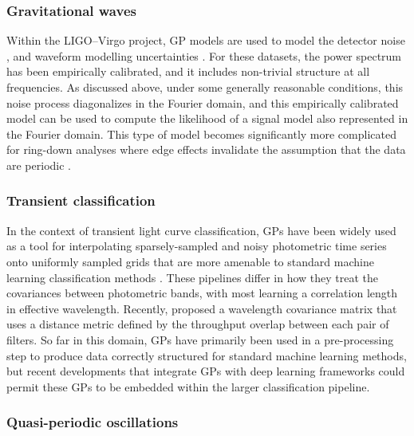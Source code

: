\documentclass[letterpaper]{ar-1col}
\begin{document}
\subsubsection{Gravitational waves} Within the LIGO--Virgo project, GP models are used to model the detector noise \citep[e.g.][]{2020CQGra..37e5002A}, and waveform modelling uncertainties \citep{2016PhRvD..93f4001M}.
For these datasets, the power spectrum has been empirically calibrated, and it includes non-trivial structure at all frequencies.
As discussed above, under some generally reasonable conditions, this noise process diagonalizes in the Fourier domain, and this empirically calibrated model can be used to compute the likelihood of a signal model also represented in the Fourier domain.
This type of model becomes significantly more complicated for ring-down analyses where edge effects invalidate the assumption that the data are periodic \citep{2021arXiv210705609I}.

\subsubsection{Transient classification} In the context of transient light curve classification, GPs have been widely used as a tool for interpolating sparsely-sampled and noisy photometric time series onto uniformly sampled grids that are more amenable to standard machine learning classification methods \citep[e.g.][]{2016ApJS..225...31L, 2019AJ....158..257B, 2019MNRAS.489.3591P, 2020ApJ...905...94V}.
These pipelines differ in how they treat the covariances between photometric bands, with most learning a correlation length in effective wavelength.
Recently, \citet{2021ApJS..255...24V} proposed a wavelength covariance matrix that uses a distance metric defined by the throughput overlap between each pair of filters.
So far in this domain, GPs have primarily been used in a pre-processing step to produce data correctly structured for standard machine learning methods, but recent developments that integrate GPs with deep learning frameworks could permit these GPs to be embedded within the larger classification pipeline.

\subsubsection{Quasi-periodic oscillations}
\end{document}
